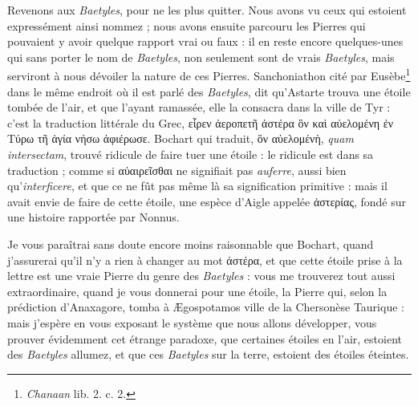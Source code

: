 \documentclass[a4paper, 11pt, oneside, polutonikogreek, french]{article}
\begin{document}
Revenons aux \emph{Baetyles}, pour ne les plus quitter. Nous avons vu ceux qui estoient expressément ainsi nommez ; nous avons ensuite parcouru les Pierres qui pouvaient y avoir quelque rapport vrai ou faux : il en reste encore quelques-unes qui sans porter le nom de \emph{Baetyles}, non seulement sont de vrais \emph{Baetyles}, mais serviront à nous dévoiler la nature de ces Pierres. Sanchoniathon cité par Eusèbe\footnote{\emph{Chanaan} lib. 2. c. 2.} dans le même endroit où il est parlé des \emph{Baetyles}, dit qu'Astarte trouva une étoile tombée de l'air, et que l'ayant ramassée, elle la consacra dans la ville de Tyr : c'est la traduction littérale du Grec, εἷρεν ἀεροπετῆ ἀστέρα ὃν καὶ αὐελομένη ἐν Τύρω τῆ ἁγία νήσω ἀφιέρωσε. Bochart qui traduit, ὃν αὐελομένὴ, \emph{quam intersectam}, trouvé ridicule de faire tuer une étoile : le ridicule est dans sa traduction ; comme si αὐαιρεῖσθαι ne signifiait pas \emph{auferre}, aussi bien qu'\emph{interficere}, et que ce ne fût pas même là sa signification primitive : mais il avait envie de faire de cette étoile, une espèce d'Aigle appelée ἀστερίας, fondé sur une histoire rapportée par Nonnus.

Je vous paraîtrai sans doute encore moins raisonnable que Bochart, quand j'assurerai qu'il n'y a rien à changer au mot ἀστέρα, et que cette étoile prise à la lettre est une vraie Pierre du genre des \emph{Baetyles} : vous me trouverez tout aussi extraordinaire, quand je vous donnerai pour une étoile, la Pierre qui, selon la prédiction d'Anaxagore, tomba à Ægospotamos ville de la Chersonèse Taurique : mais j'espère en vous exposant le système que nous allons développer, vous prouver évidemment cet étrange paradoxe, que certaines étoiles en l'air, estoient des \emph{Baetyles} allumez, et que ces \emph{Baetyles} sur la terre, estoient des étoiles éteintes.
\end{document}
